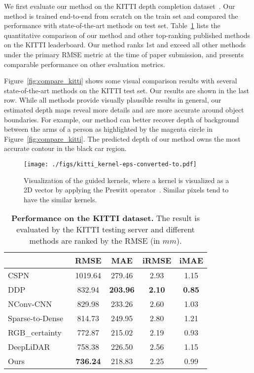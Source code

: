 \documentclass[journal]{IEEEtran}
\begin{document}
We first evaluate our method on the KITTI depth completion dataset~\cite{sparsity_cnn}.
Our method is trained end-to-end from scratch on the train set and compared the performance with state-of-the-art methods on test set. 
Table~\ref{tab:kitti_result} lists the quantitative comparison of our method and other top-ranking published methods on the  KITTI leaderboard.
Our method ranks 1st and exceed all other methods under the primary RMSE metric at the time of paper submission,
and presents comparable performance on other evaluation metrics. 




Figure~\ref{fig:compare_kitti} shows some visual comparison results with several state-of-the-art methods on the KITTI test set.
Our results are shown in the last row.
While all methods provide visually plausible results in general, our estimated depth maps reveal more details and are more accurate around object boundaries.
For example, our method can better recover depth of background between the arms of a person as highlighted by the magenta circle in Figure~\ref{fig:compare_kitti}.
The predicted depth of our method owns the most accurate contour in the black car region. 

\begin{figure*}
   \begin{center}
   \texttt{[image: ./figs/kitti\_kernel-eps-converted-to.pdf]}
   \end{center}
      \caption{Visualization of the guided kernels, where a kernel is visualized as a 2D vector by applying the Prewitt operator~\cite{prewitt}. Similar pixels tend to have the similar kernels.}
   \label{fig:flow}
\end{figure*}

\begin{table}
   \begin{center}
   \caption{{\bf Performance on the KITTI dataset.} The result is evaluated by the KITTI testing server and different methods are ranked by the RMSE (in $mm$).} \label{tab:kitti_result}
   \small
   \begin{tabular}{l|c|c|c|c} \hline
    & \textbf{RMSE}   & MAE   & iRMSE & iMAE \\ \hline
   CSPN~\cite{depth_affinity,cspn_journal} & 1019.64 & 279.46 & 2.93  & 1.15 \\
   DDP~\cite{ddp} & 832.94 & \textbf{203.96} & \textbf{2.10} & \textbf{0.85} \\
   NConv-CNN~\cite{cnn_confidence} & 829.98 & 233.26 & 2.60 & 1.03 \\
   Sparse-to-Dense~\cite{self_supervised} & 814.73 & 249.95 & 2.80 & 1.21 \\
   RGB\_certainty~\cite{sparse_noisy} & 772.87 & 215.02 & 2.19  & 0.93 \\
   DeepLiDAR~\cite{deep_lidar} & 758.38 & 226.50 & 2.56 & 1.15 \\  \hline
   Ours & \textbf{736.24} & 218.83 & 2.25 & 0.99 \\ \hline
   \end{tabular}
   \end{center}
\end{table}
\end{document}
